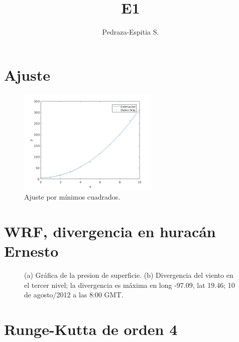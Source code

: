 \documentclass{article}
\title{E1}
\author{{Pedraza-Espitia S.}}
\date{}
\begin{document}
\maketitle

\section{Ajuste}

\begin{figure}[!hbt]
\centering
  \includegraphics[width=0.6\textwidth]{E1_i4_ajuste}
	\caption{Ajuste por mínimos cuadrados.}%
	\label{fig:e1ajuste}
\end{figure}

\section{WRF, divergencia en  hurac\'an Ernesto}

\begin{figure}[!ht]
\centering
  \hfill{}\hfill
\caption{(a) Gr\'afica de la presion de superficie. (b) Divergencia del viento en el tercer nivel; la divergencia es  máxima en long \mbox{-97.09}, lat 19.46; 10 de agosto/2012 a las 8:00 GMT.}%
\label{fig:netcdfdiver}
\end{figure}
\section{Runge-Kutta de orden 4}


\end{document}
